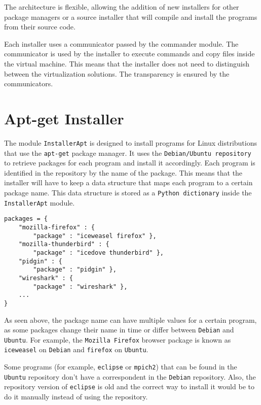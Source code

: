 The architecture is flexible, allowing the addition of new installers for 
other package managers or a source installer that will compile and install 
the programs from their source code. 

Each installer uses a communicator passed by the commander module. 
The communicator is used by the installer to execute commands and 
copy files inside the virtual machine. This means that the installer does 
not need to distinguish between the virtualization solutions. The
transparency is ensured by the communicators.

\section{Apt-get Installer} \label{sec:apt-inst}
The module \texttt{InstallerApt} is designed to install programs for Linux 
distributions that use the \texttt{apt-get} package manager. It uses the 
\texttt{Debian/Ubuntu repository} to retrieve packages for each program and 
install it accordingly. Each program is identified in the repository by the name 
of the package. This means that the installer will have to keep a data structure 
that maps each program to a certain package name. This data structure is 
stored as a \texttt{Python dictionary} inside the \texttt{InstallerApt} module.
\\
\lstset{language=Python,caption=Apt package name mapping,
label=lst:apt-dict}
\begin{lstlisting}
packages = {
	"mozilla-firefox" : {
 		"package" : "iceweasel firefox" },
	"mozilla-thunderbird" : { 
		"package" : "icedove thunderbird" },
	"pidgin" : {
 		"package" : "pidgin" },
	"wireshark" : {
 		"package" : "wireshark" },
	...
}
\end{lstlisting}

As seen above, the package name can have multiple values for a certain 
program, as some packages change their name in time or differ between 
\texttt{Debian} and \texttt{Ubuntu}. For example, the \texttt{Mozilla 
Firefox} browser package is known as \texttt{iceweasel} on \texttt{Debian} 
and \texttt{firefox} on \texttt{Ubuntu}.

Some programs (for example, \texttt{eclipse} or \texttt{mpich2}) that can 
be found in the \texttt{Ubuntu} repository don't have a correspondent in 
the \texttt{Debian} repository. Also, the repository version of \texttt{eclipse} 
is old and the correct way to install it would be to do it manually instead of 
using the repository. 

